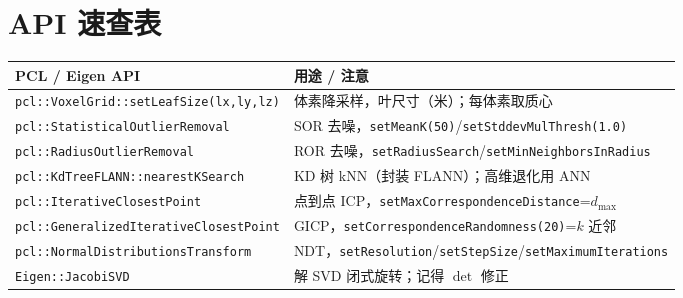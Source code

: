 \section*{API 速查表}
\begin{table}[H]\centering\small
\begin{tabular}{p{} p{}}
\toprule
PCL / Eigen API & 用途 / 注意 \\
\midrule
\texttt{pcl::VoxelGrid::setLeafSize(lx,ly,lz)} & 体素降采样，叶尺寸（米）；每体素取质心 \\
\texttt{pcl::StatisticalOutlierRemoval} & SOR 去噪，\texttt{setMeanK(50)}/\texttt{setStddevMulThresh(1.0)} \\
\texttt{pcl::RadiusOutlierRemoval} & ROR 去噪，\texttt{setRadiusSearch}/\texttt{setMinNeighborsInRadius} \\
\texttt{pcl::KdTreeFLANN::nearestKSearch} & KD 树 kNN（封装 FLANN）；高维退化用 ANN \\
\texttt{pcl::IterativeClosestPoint} & 点到点 ICP，\texttt{setMaxCorrespondenceDistance}=$d_{\max}$ \\
\texttt{pcl::GeneralizedIterativeClosestPoint} & GICP，\texttt{setCorrespondenceRandomness(20)}=$k$ 近邻 \\
\texttt{pcl::NormalDistributionsTransform} & NDT，\texttt{setResolution}/\texttt{setStepSize}/\texttt{setMaximumIterations} \\
\texttt{Eigen::JacobiSVD} & 解 SVD 闭式旋转；记得 $\det$ 修正 \\
\bottomrule
\end{tabular}
\end{table}
